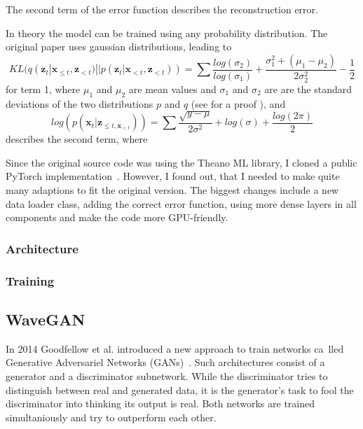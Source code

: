 \documentclass[12pt]{article}
\begin{document}
The second term of the error function describes the reconstruction error.

In theory the model can be trained using any probability distribution.
The original paper uses gaussian distributions, leading to
$$
KL(q(\mathbf{z}_t | \mathbf{x}_{\le t}, \mathbf{z}_{<t}) || p(\mathbf{z}_t | \mathbf{x}_{<t}, \mathbf{z}_{<t}))
= \sum \frac{log(\sigma_2)}{log(\sigma_1)}+\frac{\sigma_1^2 + (\mu_1 - \mu_2)}{2 \sigma_2^2} - \frac{1}{2}
$$
for term 1, where $\mu_1$ and $\mu_2$ are mean values and $\sigma_1$ and $\sigma_2$ are are the standard deviations of the two distributions $p$ and $q$ (see \cite{klproof} for a proof ), and
$$
log(p(\mathbf{x}_t | \mathbf{z}_{\le t, \mathbf{x}_{<t}}))
= \sum \frac{\sqrt{y-\mu}}{2 \sigma^2} + log(\sigma) + \frac{log(2\pi)}{2}
$$
describes the second term, where %


Since the original source code was using the Theano ML library, I cloned a public PyTorch implementation~\cite{VRNNgit}.
However, I found out, that I needed to make quite many adaptions to fit the original version.
The biggest changes include a new data loader class, adding the correct error function, using more dense layers in all components and make the code more GPU-friendly. 



\subsubsection{Architecture}
\subsubsection{Training}










\subsection{WaveGAN}
In 2014 Goodfellow et al. introduced a new approach to train networks ca lled Generative Adversariel Networks (GANs)~\cite{goodfellow2014generative}.
Such architectures consist of a generator and a discriminator subnetwork.
While the discriminator tries to distinguish between real and generated data, it is the generator's task to fool the discriminator into thinking its output is real.
Both networks are trained simultaniously and try to outperform each other.
\end{document}
